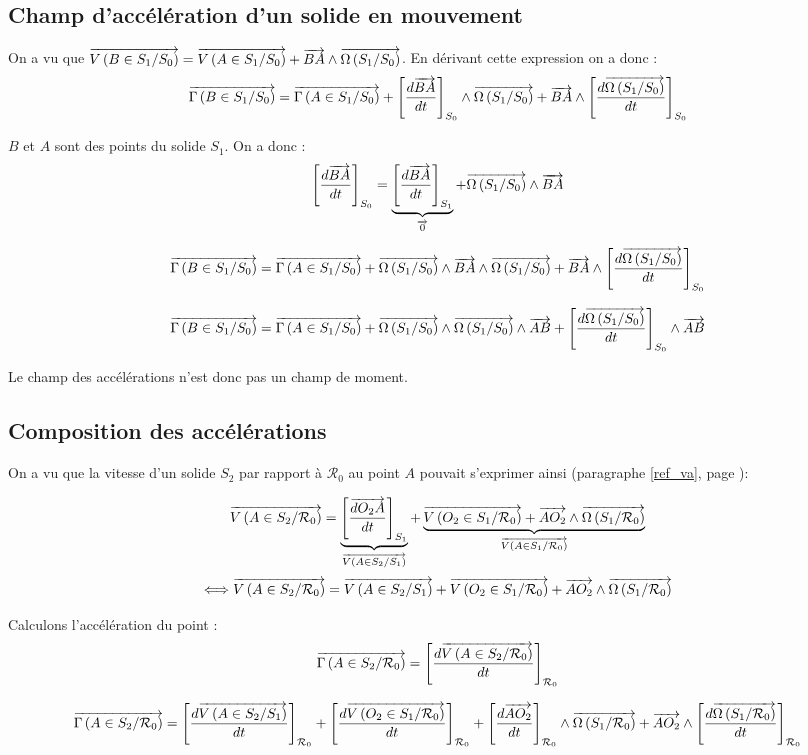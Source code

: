 \documentclass[10pt,oneside]{article}
\begin{document}
\subsection{Champ d'accélération d'un solide en mouvement}
On a vu que 
$\vectv{B}{S_1}{S_0} = \vectv{A}{S_1}{S_0} + \vect{BA} \wedge \vecto{S_1}{S_0}$. En dérivant cette expression on a donc : 
$$
\vectg{B}{S_1}{S_0} 
= \vectg{A}{S_1}{S_0} 
+\left[\dfrac{d\vect{BA}}{dt}\right]_{S_0} \wedge \vecto{S_1}{S_0}
+\vect{BA} \wedge \left[\dfrac{d\vecto{S_1}{S_0}}{dt}\right]_{S_0}
$$

$B$ et $A$ sont des points du solide $S_1$. On a donc : 
 $$
\left[\dfrac{d\vect{BA}}{dt}\right]_{S_0} =
\underbrace{\left[\dfrac{d\vect{BA}}{dt}\right]_{S_1}}_{\vect{0}} 
+ \vecto{S_1}{S_0} \wedge \vect{BA}
$$

$$
\vectg{B}{S_1}{S_0} 
= \vectg{A}{S_1}{S_0} 
+\vecto{S_1}{S_0} \wedge \vect{BA}
\wedge \vecto{S_1}{S_0}
+\vect{BA} \wedge \left[\dfrac{d\vecto{S_1}{S_0}}{dt}\right]_{S_0}
$$

$$
\vectg{B}{S_1}{S_0} 
= \vectg{A}{S_1}{S_0} 
+\vecto{S_1}{S_0} \wedge \vecto{S_1}{S_0}
\wedge \vect{AB}
+\left[\dfrac{d\vecto{S_1}{S_0}}{dt}\right]_{S_0} \wedge \vect{AB} 
$$

\begin{resultat}
Le champ des accélérations n'est donc pas un champ de moment.
\end{resultat}

\subsection{Composition des accélérations}
On a vu que la vitesse d'un solide $S_2$ par rapport à $\mathcal{R}_0$ au point $A$ pouvait s'exprimer ainsi (paragraphe \ref{ref_va}, page \pageref{ref_va}):

$$
\vectv{A}{S_2}{\mathcal{R}_0}
=
\underbrace{\left[\dfrac{\vect{dO_2 A}}{dt}\right]_{S_1}}_{\vectv{A}{S_2}{S_1}}
+
\underbrace{\vectv{O_2}{S_1}{\mathcal{R}_0}
+
\vect{AO_2}
\wedge 
\vecto{S_1}{\mathcal{R}_0}}_{\vectv{A}{S_1}{\mathcal{R}_0}}
$$
$$
\Longleftrightarrow
\vectv{A}{S_2}{\mathcal{R}_0}
=
\vectv{A}{S_2}{S_1} + \vectv{O_2}{S_1}{\mathcal{R}_0}
+
\vect{AO_2}
\wedge 
\vecto{S_1}{\mathcal{R}_0}
$$

Calculons l'accélération du point : 
$$
\vectg{A}{S_2}{\mathcal{R}_0}=
\left[
\dfrac{d\vectv{A}{S_2}{\mathcal{R}_0}}{dt}
\right]_{\mathcal{R}_0}
$$

$$
\vectg{A}{S_2}{\mathcal{R}_0}
=
\left[
\dfrac{d
\vectv{A}{S_2}{S_1} }{dt}
\right]_{\mathcal{R}_0}
+ 
\left[
\dfrac{d\vectv{O_2}{S_1}{\mathcal{R}_0}}{dt}
\right]_{\mathcal{R}_0}
+
\left[
\dfrac{d\vect{AO_2}}{dt}
\right]_{\mathcal{R}_0}
\wedge 
\vecto{S_1}{\mathcal{R}_0}
+
\vect{AO_2}
\wedge 
\left[
\dfrac{d\vecto{S_1}{\mathcal{R}_0}}{dt}
\right]_{\mathcal{R}_0}
$$
\end{document}
